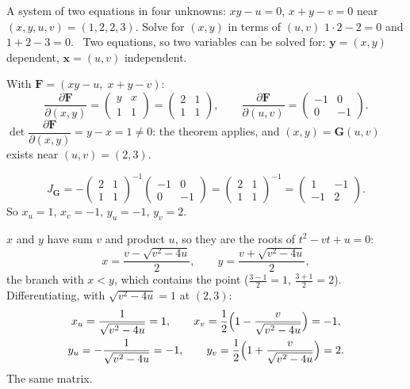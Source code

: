 \begin{worked}{A system of two equations in four unknowns: $xy-u=0$, $x+y-v=0$ near $(x,y,u,v)=(1,2,2,3)$. Solve for $(x,y)$ in terms of $(u,v)$}
$1\cdot2-2=0$ and $1+2-3=0$. \checkmark\ Two equations, so two variables
can be solved for: $\mathbf{y}=(x,y)$ dependent, $\mathbf{x}=(u,v)$
independent.

With $\mathbf{F}=(xy-u,\;x+y-v)$:
\[
  \frac{\partial\mathbf{F}}{\partial(x,y)}=\begin{pmatrix}y&x\\1&1
  \end{pmatrix}=\begin{pmatrix}2&1\\1&1\end{pmatrix},\qquad
  \frac{\partial\mathbf{F}}{\partial(u,v)}=\begin{pmatrix}-1&0\\0&-1
  \end{pmatrix} .
\]
$\det\dfrac{\partial\mathbf{F}}{\partial(x,y)}=y-x=1\neq0$: the theorem
applies, and $(x,y)=\mathbf{G}(u,v)$ exists near $(u,v)=(2,3)$.

\[
  J_{\mathbf{G}}=-\begin{pmatrix}2&1\\1&1\end{pmatrix}^{-1}
  \begin{pmatrix}-1&0\\0&-1\end{pmatrix}
  =\begin{pmatrix}2&1\\1&1\end{pmatrix}^{-1}
  =\begin{pmatrix}1&-1\\-1&2\end{pmatrix} .
\]
So $x_{u}=1$, $x_{v}=-1$, $y_{u}=-1$, $y_{v}=2$.

$x$ and $y$ have sum $v$ and product $u$, so they are the roots of
$t^{2}-vt+u=0$:
\[
  x=\frac{v-\sqrt{v^{2}-4u}}{2},\qquad y=\frac{v+\sqrt{v^{2}-4u}}{2},
\]
the branch with $x<y$, which contains the point ($\frac{3-1}{2}=1$,
$\frac{3+1}{2}=2$). Differentiating, with $\sqrt{v^{2}-4u}=1$ at $(2,3)$:
\[\begin{gathered}
  x_{u}=\frac{1}{\sqrt{v^{2}-4u}}=1,\qquad
  x_{v}=\frac12\Bigl(1-\frac{v}{\sqrt{v^{2}-4u}}\Bigr)=-1,\\
  y_{u}=-\frac{1}{\sqrt{v^{2}-4u}}=-1,\qquad
  y_{v}=\frac12\Bigl(1+\frac{v}{\sqrt{v^{2}-4u}}\Bigr)=2 .
\end{gathered}\]
The same matrix. \checkmark
{}


\end{worked}
